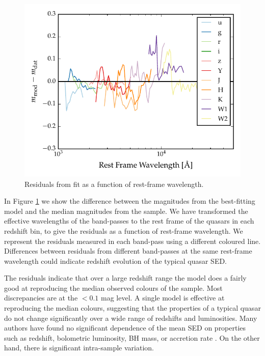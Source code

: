\begin{figure}
  \centering
  \includegraphics[width=\textwidth]{figures/chapter05/model_residuals.pdf}
  \caption{Residuals from fit as a function of rest-frame wavelength. }
  \label{fig:residuals}
\end{figure}

In Figure \ref{fig:residuals} we show the difference between the magnitudes from the best-fitting model and the median magnitudes from the sample. 
We have transformed the effective wavelengths of the band-passes to the rest frame of the quasars in each redshift bin, to give the residuals as a function of rest-frame wavelength. 
We represent the residuals measured in each band-pass using a different coloured line. 
Differences between residuals from different band-passes at the same rest-frame wavelength could indicate redshift evolution of the typical quasar \ac{SED}. 

The residuals indicate that over a large redshift range the model does a fairly good at reproducing the median observed colours of the sample. 
Most discrepancies are at the $<0.1$ mag level. 
A single model is effective at reproducing the median colours, suggesting that the properties of a typical quasar do not change significantly over a wide range of redshifts and luminosities. 
Many authors have found no significant dependence of the mean \ac{SED} on properties such as redshift, bolometric luminosity, \ac{BH} mass, or accretion rate \citep[e.g.][]{elvis12,hao13}. 
On the other hand, there is significant intra-sample variation. 

